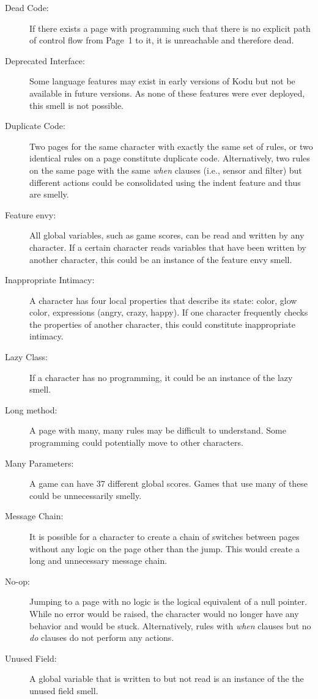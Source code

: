 \documentclass{sig-alternate}
\newcommand{\todo}[1]{\textbf{TODO: #1}}
\begin{document}
\begin{description}
\item[Dead Code:] If there exists a page with programming such that there is no explicit path of control flow from Page~1 to it, it is unreachable and therefore dead. 
\item[Deprecated Interface:] Some language features may exist in early versions of Kodu but not be available in future versions. As none of these features were ever deployed, this smell is not possible. 
\item[Duplicate Code:] Two pages for the same character with exactly the same set of rules, or two identical rules on a page constitute duplicate code. Alternatively, two rules on the same page with the same \emph{when} clauses (i.e., sensor and filter) but different actions could be consolidated using the indent feature and thus are smelly. 
\item[Feature envy:] All global variables, such as game scores, can be read and written by any character. If a certain character reads variables that have been written by another character, this could be an instance of the feature envy smell. 
\item[Inappropriate Intimacy:] A character has four local properties that describe its state: color, glow color, expressions (angry, crazy, happy). If one character frequently checks the properties of another character, this could constitute inappropriate intimacy. 
\item[Lazy Class:] If a character has no programming, it could be an instance of the lazy smell. 
\item[Long method:] A page with many, many rules may be difficult to understand. Some programming could potentially move to other characters. %
\item[Many Parameters:] A game can have 37 different global scores. Games that use many of these could be unnecessarily smelly. %
\item[Message Chain:] It is possible for a character to create a chain of switches between pages without any logic on the page other than the jump. This would create a long and unnecessary message chain. 
\item[No-op:] Jumping to a page with no logic is the logical equivalent of a null pointer. While no error would be raised, the character would no longer have any behavior and would be stuck. Alternatively, rules with \emph{when} clauses but no \emph{do} clauses do not perform any actions. 
\item[Unused Field:] A global variable that is written to but not read is an instance of the the unused field smell. 

\end{description}
\end{document}
